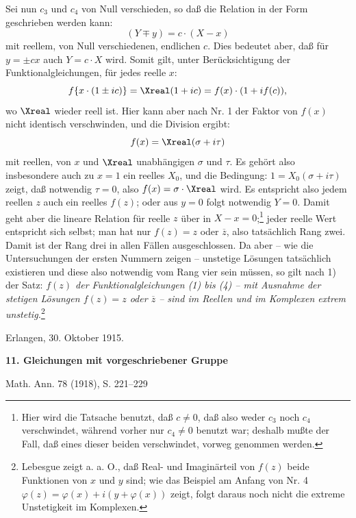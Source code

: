 \documentclass[11pt]{article}
\begin{document}
Sei nun \(c_3\) und \(c_4\) von Null verschieden, so daß die Relation in der Form geschrieben werden kann:
\[
(Y\mp y)=c\cdot(X-x)
\]
mit reellem, von Null verschiedenen, endlichen \(c\). Dies bedeutet aber, daß für \(y=\pm cx\) auch \(Y=c\cdot X\) wird. Somit gilt, unter Berücksichtigung der Funktionalgleichungen, für jedes reelle \(x\):
\[
f\{x\cdot(1\pm ic)\}=\Xreal(1+ic)=f(x)\cdot(1+i f(c)),
\]
wo \(\Xreal\) wieder reell ist. Hier kann aber nach Nr. 1 der Faktor von \(f(x)\) nicht identisch verschwinden, und die Division ergibt:
\[
f(x)=\Xreal(\sigma+i\tau)
\]
mit reellen, von \(x\) und \(\Xreal\) unabhängigen \(\sigma\) und \(\tau\). Es gehört also insbesondere auch zu \(x=1\) ein reelles \(X_0\), und die Bedingung: \(1=X_0(\sigma+i\tau)\) zeigt, daß notwendig \(\tau=0\), also \(f(x)=\sigma\cdot\Xreal\) wird. Es entspricht also jedem reellen \(z\) auch ein reelles \(f(z)\); oder aus \(y=0\) folgt notwendig \(Y=0\). Damit geht aber die lineare Relation für reelle \(z\) über in \(X-x=0\);\footnote{Hier wird die Tatsache benutzt, daß \(c\ne0\), daß also weder \(c_3\) noch \(c_4\) verschwindet, während vorher nur \(c_4\ne0\) benutzt war; deshalb mußte der Fall, daß eines dieser beiden verschwindet, vorweg genommen werden.} jeder reelle Wert entspricht sich selbst; man hat nur \(f(z)=z\) oder \(\overline z\), also tatsächlich Rang zwei. Damit ist der Rang drei in allen Fällen ausgeschlossen. Da aber -- wie die Untersuchungen der ersten Nummern zeigen -- unstetige Lösungen tatsächlich existieren und diese also notwendig vom Rang vier sein müssen, so gilt nach 1) der Satz: \emph{ \(f(z)\) \emph{der Funktionalgleichungen (1) bis (4) -- mit Ausnahme der stetigen Lösungen} \(f(z)=z\) \emph{oder} \(\overline z\) -- \emph{sind im Reellen und im Komplexen extrem unstetig.}}\footnote{Lebesgue zeigt a. a. O., daß Real- und Imaginärteil von \(f(z)\) beide  Funktionen von \(x\) und \(y\) sind; wie das Beispiel am Anfang von Nr. 4 \(\varphi(z)=\varphi(x)+i(y+\varphi(x))\) zeigt, folgt daraus noch nicht die extreme Unstetigkeit im Komplexen.}

\medskip
\noindent Erlangen, 30. Oktober 1915.


\clearpage
\begin{center}
{\Large\bfseries 11. Gleichungen mit vorgeschriebener Gruppe}\par
\vspace{1.5em}
Math. Ann. 78 (1918), S. 221--229
\end{center}

\vspace{4em}
\end{document}

